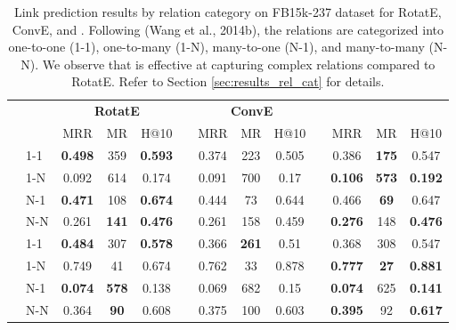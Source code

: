 \documentclass[11pt,a4paper]{article}
\begin{document}
\begin{table*}[t]
	\centering
\begin{tabular}{lm{3em}ccccccccccc}
	\toprule
	
	{} &  {} & \multicolumn{3}{c}{\textbf{RotatE}} && \multicolumn{3}{c}{\textbf{ConvE}} && \multicolumn{3}{c}{\textbf{\method{}}} \\
	\cmidrule(r){3-5}  \cmidrule(r){7-9} \cmidrule(r){11-13}
	{} & &   MRR & MR   & H@10  &&  MRR & MR   & H@10  &&  MRR & MR   & H@10   \\
	\midrule
		\multirow{4}{*}{\rotatebox[origin=c]{90}{Head Pred}}& 1-1 & \textbf{0.498}	& 359	& \textbf{0.593	}&& 0.374	& 223	& 0.505	&& 0.386	& \textbf{175}	& 0.547 \\
		& 1-N & 0.092	& 614	& 0.174	&& 0.091	& 700	& 0.17	&& \textbf{0.106}	& \textbf{573}	& \textbf{0.192} \\
		& N-1 & \textbf{0.471}	& 108	& \textbf{0.674}	&& 0.444	& 73	& 0.644	&& 0.466	& \textbf{69}	& 0.647 \\
		& N-N & 0.261	& \textbf{141}	& \textbf{0.476}	&& 0.261	& 158	& 0.459	&& \textbf{0.276}	& 148	& \textbf{0.476} \\
		\midrule
		\multirow{4}{*}{\rotatebox[origin=c]{90}{Tail Pred}}& 1-1 & \textbf{0.484}	& 307	& \textbf{0.578} && 0.366	& \textbf{261}	& 0.51	&& 0.368	& 308	& 0.547 \\
		& 1-N & 0.749	& 41	& 0.674	&& 0.762	& 33	& 0.878	&& \textbf{0.777}	& \textbf{27}	&\textbf{ 0.881} \\
		& N-1 & \textbf{0.074}	& \textbf{578}	& 0.138	&& 0.069	& 682	& 0.15	&& \textbf{0.074}	& 625	& \textbf{0.141} \\
		& N-N & 0.364	& \textbf{90}	& 0.608	&& 0.375	& 100	& 0.603	&& \textbf{0.395}	& 92	& \textbf{0.617} \\
	\bottomrule
\end{tabular}
	\caption{\label{tbl:results_rel_cat} Link prediction results by relation category on FB15k-237 dataset for RotatE, ConvE, and \method{}. Following (Wang et al., 2014b), the relations are categorized into one-to-one (1-1), one-to-many (1-N), many-to-one (N-1), and many-to-many (N-N). We observe that \method{} is effective at capturing complex relations compared to RotatE. Refer to Section \ref{sec:results_rel_cat} for details.}
\end{table*}
\end{document}
